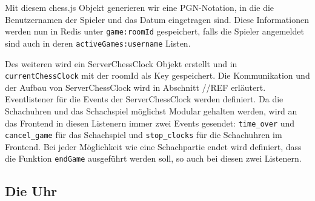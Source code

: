 Mit diesem chess.js Objekt generieren wir eine PGN-Notation, in die die Benutzernamen der Spieler und das Datum eingetragen sind. Diese Informationen werden nun in Redis unter \verb|game:roomId| gespeichert, falls die Spieler angemeldet sind auch in deren \verb|activeGames:username| Listen. 

Des weiteren wird ein ServerChessClock Objekt erstellt und in \verb|currentChessClock| mit der roomId als Key gespeichert. Die Kommunikation und der Aufbau von ServerChessClock wird in Abschnitt //REF erläutert.
Eventlistener für die Events der ServerChessClock werden definiert.
Da die Schachuhren und das Schachspiel möglichst Modular gehalten werden, wird an das Frontend in diesen Listenern immer zwei Events gesendet: \verb|time_over| und \verb|cancel_game| für das Schachspiel und \verb|stop_clocks| für die Schachuhren im Frontend. Bei jeder Möglichkeit wie eine Schachpartie endet wird definiert, dass die Funktion \verb|endGame| ausgeführt werden soll, so auch bei diesen zwei Listenern.

\subsection{Die Uhr}